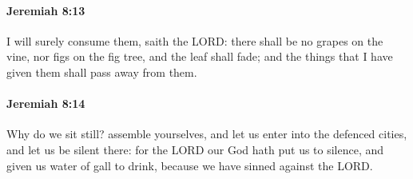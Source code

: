 		\paragraph{Jeremiah 8:13} %
			\label{JEREMIAH-8-13}

			I will surely consume them, saith the LORD: there shall be no grapes on the vine, nor figs on the fig tree, and the leaf shall fade; and the things that I have given them shall pass away from them.


		\paragraph{Jeremiah 8:14} %
			\label{JEREMIAH-8-14}

			Why do we sit still? assemble yourselves, and let us enter into the defenced cities, and let us be silent there: for the LORD our God hath put us to silence, and given us water of gall to drink, because we have sinned against the LORD.

